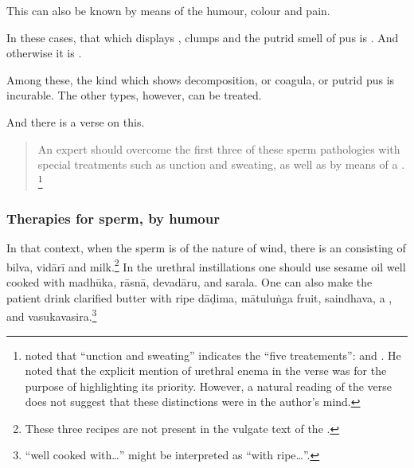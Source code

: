\begin{translation}
 This can also be known by means of the humour, colour and pain.
 
 In these cases, that which displays , clumps 
 and the putrid smell of pus is . And otherwise it is 
 .
 
 
  Among these, the kind which shows decomposition, or coagula, or 
  putrid pus is incurable. The other types, however, can be treated.  
 
 \item[6]
 
 And there is a verse on this. 
 
 \begin{quote}
      An expert should overcome the first three of these sperm
pathologies with special
treatments such as unction and sweating,
as well as by means of a .\label{uttarabastyantam}%
\footnote{ noted that “unction and sweating”
    indicates the “five treatements”:  and .  He noted that the explicit mention
    of urethral enema in the verse was for the purpose of highlighting its
    priority. However, a natural reading of the verse does not suggest
    that these distinctions were in the author's mind.}
    
 \end{quote}
 
 \subsubsection{Therapies for sperm, by humour}
 
 \item[6.1] 
 
In that context, when the sperm is of the nature of wind, there is an
 consisting of \gls{bilva}, \gls{vidārī} and
milk.\footnote{These three recipes are not present in the vulgate text
    of the \SS.} %
    In the urethral
    instillations one should use sesame oil well cooked with \gls{madhūka},
    \gls{rāsnā}, \gls{devadāru}, and \gls{sarala}. One can also make
    the patient drink clarified butter with ripe \gls{dāḍima},
    \gls{mātuluṅga} fruit, \gls{saindhava}, a ,
    and \gls{vasukavasira}.\footnote{ “well cooked with\ldots” 
    might be interpreted as “with ripe\ldots”.}
 

\end{translation}
